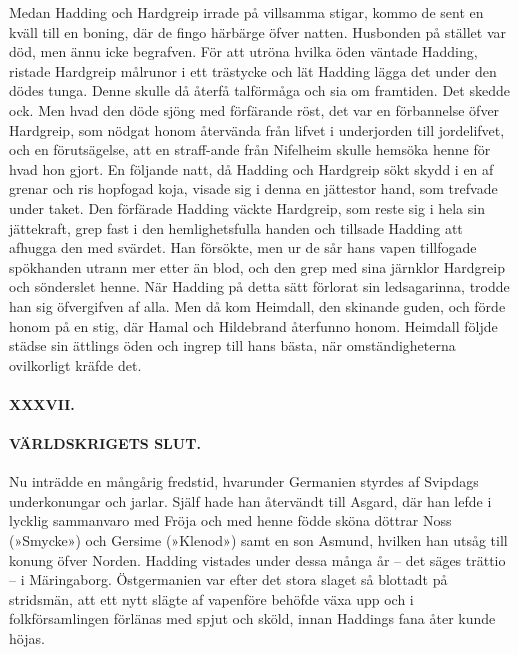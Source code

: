 Medan Hadding och Hardgreip irrade på villsamma stigar, kommo de sent en
kväll till en boning, där de fingo härbärge öfver natten. Husbonden på
stället var död, men ännu icke begrafven. För att utröna hvilka öden
väntade Hadding, ristade Hardgreip målrunor i ett trästycke och lät
Hadding lägga det under den dödes tunga. Denne skulle då återfå
talförmåga och sia om framtiden. Det skedde ock. Men hvad den döde sjöng
med förfärande röst, det var en förbannelse öfver Hardgreip, som nödgat
honom återvända från lifvet i underjorden till jordelifvet, och en
förutsägelse, att en straff-ande från Nifelheim skulle hemsöka henne för
hvad hon gjort. En följande natt, då Hadding och Hardgreip sökt skydd i
en af grenar och ris hopfogad koja, visade sig i denna en jättestor
hand, som trefvade under taket. Den förfärade Hadding väckte Hardgreip,
som reste sig i hela sin jättekraft, grep fast i den hemlighetsfulla
handen och tillsade Hadding att afhugga den med svärdet. Han försökte,
men ur de sår hans vapen tillfogade spökhanden utrann mer etter än blod,
och den grep med sina järnklor Hardgreip och sönderslet henne. När
Hadding på detta sätt förlorat sin ledsagarinna, trodde han sig
öfvergifven af alla. Men då kom
\protect\hypertarget{lb1625905.xhtmlux5cux23start161}{}{}\protect\hypertarget{lb1625905.xhtmlux5cux23start161-a}{}{}\protect\hypertarget{lb1625905.xhtmlux5cux23start161-b}{}{}\protect\hypertarget{lb1625905.xhtmlux5cux23start161-c}{}{}\protect\hypertarget{lb1625905.xhtmlux5cux23start161-d}{}{}
Heimdall, den skinande guden, och förde honom på en stig, där Hamal och
Hildebrand återfunno honom. Heimdall följde städse sin ättlings öden och
ingrep till hans bästa, när omständigheterna ovilkorligt kräfde det.

\paragraph{XXXVII.}

\paragraph{VÄRLDSKRIGETS SLUT.}

Nu inträdde en mångårig fredstid, hvarunder Germanien styrdes af
Svipdags underkonungar och jarlar. Själf hade han återvändt till Asgard,
där han lefde i lycklig sammanvaro med Fröja och med henne födde sköna
döttrar Noss (»Smycke») och Gersime (»Klenod») samt en son Asmund,
hvilken han utsåg till konung öfver Norden. Hadding vistades under dessa
många år -- det säges trättio -- i Märingaborg. Östgermanien var efter
det stora slaget så blottadt på stridsmän, att ett nytt slägte af
vapenföre behöfde växa upp och i folkförsamlingen förlänas med spjut och
sköld, innan Haddings fana åter kunde höjas.

